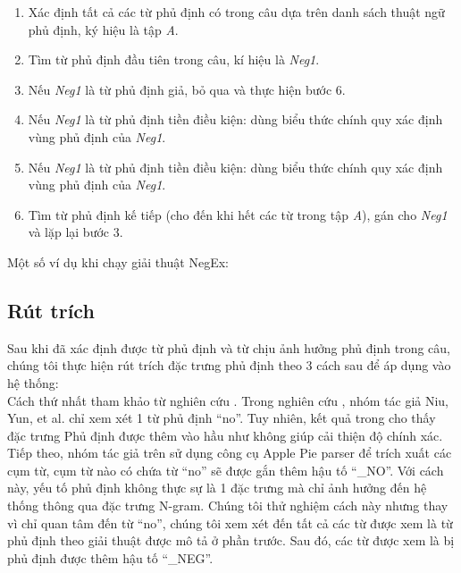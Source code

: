 \begin{enumerate}
\item Xác định tất cả các từ phủ định có trong câu dựa trên danh sách thuật ngữ phủ định, ký hiệu là tập \textit{A}.
\item Tìm từ phủ định đầu tiên trong câu, kí hiệu là \textit{Neg1}.
\item Nếu \textit{Neg1} là từ phủ định giả, bỏ qua và thực hiện bước 6.
\item Nếu \textit{Neg1} là từ phủ định tiền điều kiện: dùng biểu thức chính quy  xác định vùng phủ định của \textit{Neg1}.
\item Nếu \textit{Neg1} là từ phủ định tiền điều kiện: dùng biểu thức chính quy  xác định vùng phủ định của \textit{Neg1}.
\item Tìm từ phủ định kế tiếp (cho đến khi hết các từ trong tập \textit{A}), gán cho \textit{Neg1} và lặp lại bước 3.
\end{enumerate}

Một số ví dụ khi chạy giải thuật NegEx:


\subsection*{Rút trích}
Sau khi đã xác định được từ phủ định và từ chịu ảnh hưởng phủ định trong câu, chúng tôi thực hiện rút trích đặc trưng phủ định theo 3 cách sau để áp dụng vào hệ thống:\\


Cách thứ nhất tham khảo từ nghiên cứu \cite{niu2005analysis}. Trong nghiên cứu \cite{niu2005analysis}, nhóm tác giả Niu, Yun, et al. chỉ xem xét 1 từ phủ định ``no''. Tuy nhiên, kết quả trong cho thấy đặc trưng Phủ định được thêm vào hầu như không giúp cải thiện độ chính xác. Tiếp theo, nhóm tác giả trên sử dụng công cụ Apple Pie parser để trích xuất các cụm từ, cụm từ nào có chứa từ ``no'' sẽ được gắn thêm hậu tố ``\_NO''. Với cách này, yếu tố phủ định không thực sự là 1 đặc trưng mà chỉ ảnh hưởng đến hệ thống thông qua đặc trưng N-gram. Chúng tôi thử nghiệm cách này nhưng thay vì chỉ quan tâm đến từ ``no'', chúng tôi xem xét đến tất cả các từ được xem là từ phủ định theo giải thuật được mô tả ở phần trước. Sau đó, các từ được xem là bị phủ định được thêm hậu tố ``\_NEG''.


